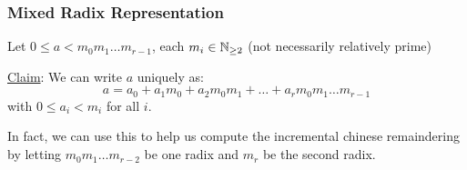 \subsubsection{Mixed Radix Representation}
Let $0 \leq a < m_0m_1\ldots m_{r-1}$, each $m_i \in \operatorname{\mathbb{N}}_{\geq 2}$ (not necessarily relatively prime)

\ul{Claim}: We can write $a$ uniquely as:
\begin{equation*}
    a = a_0 + a_1m_0 + a_2m_0m_1 + \ldots + a_rm_0m_1\ldots m_{r-1}
\end{equation*}
with $0 \leq a_i < m_i$ for all $i$.

In fact, we can use this to help us compute the incremental chinese remaindering by letting $m_0m_1\ldots m_{r-2}$ be one radix and $m_r$ be the second radix.